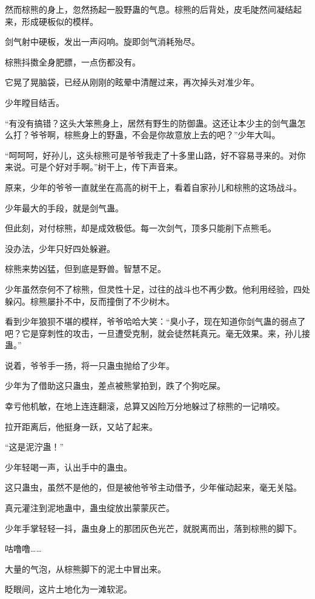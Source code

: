 \begin{this_body}
然而棕熊的身上，忽然扬起一股野蛊的气息。棕熊的后背处，皮毛陡然间凝结起来，形成硬板似的模样。

剑气射中硬板，发出一声闷响。旋即剑气消耗殆尽。

棕熊抖擞全身肥膘，一点伤都没有。

它晃了晃脑袋，已经从刚刚的眩晕中清醒过来，再次掉头对准少年。

少年瞠目结舌。

“有没有搞错？这头大笨熊身上，居然有野生的防御蛊。这还让本少主的剑气蛊怎么打？爷爷啊，棕熊身上的野蛊，不会是你故意放上去的吧？”少年大叫。

“呵呵呵，好孙儿，这头棕熊可是爷爷我走了十多里山路，好不容易寻来的。对你来说。可是个好对手啊。”树干上，传下声音来。

原来，少年的爷爷一直就坐在高高的树干上，看着自家孙儿和棕熊的这场战斗。

少年最大的手段，就是剑气蛊。

但此刻，对付棕熊，却是成效极低。每一次剑气，顶多只能削下点熊毛。

没办法，少年只好四处躲避。

棕熊来势凶猛，但到底是野兽。智慧不足。

少年虽然奈何不了棕熊，但灵性十足，过往的战斗也不再少数。他利用经验，四处躲闪。棕熊屡扑不中，反而撞倒了不少树木。

看到少年狼狈不堪的模样，爷爷哈哈大笑：“臭小子，现在知道你剑气蛊的弱点了吧？它是穿刺性的攻击，一旦遭受克制，就会徒然耗真元。毫无效果。来，孙儿接蛊。”

说着，爷爷手一扬，将一只蛊虫抛给了少年。

少年为了借助这只蛊虫，差点被熊掌拍到，跌了个狗吃屎。

幸亏他机敏，在地上连连翻滚，总算又凶险万分地躲过了棕熊的一记啃咬。

拉开距离后，他挺身一跃，又站了起来。

“这是泥泞蛊！”

少年轻喝一声，认出手中的蛊虫。

这只蛊虫，虽然不是他的，但是被他爷爷主动借予，少年催动起来，毫无关隘。

真元灌注到泥地蛊中，蛊虫绽放出蒙蒙灰芒。

少年手掌轻轻一抖，蛊虫身上的那团灰色光芒，就脱离而出，落到棕熊的脚下。

咕噜噜……

大量的气泡，从棕熊脚下的泥土中冒出来。

眨眼间，这片土地化为一滩软泥。


\end{this_body}
